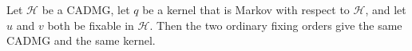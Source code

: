 Let \(\mathcal H\) be a CADMG, let \(q\) be a kernel that is Markov with respect to \(\mathcal H\), and let \(u\) and \(v\) both be fixable in \(\mathcal H\). Then the two ordinary fixing orders give the same CADMG and the same kernel.